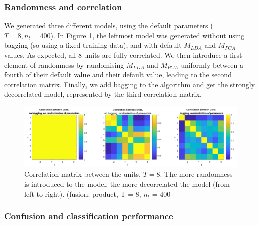 \documentclass[10pt,technote]{IEEEtran}
\begin{document}
\subsubsection{Randomness and correlation}
We generated three different models, using the default parameters ($T = 8, n_t = 400$). In Figure \ref{fig:corrs}, the leftmost model was generated without using bagging (so using a fixed training data), and with default $M_{LDA}$ and $M_{PCA}$ values. As expected, all 8 units are fully correlated. We then introduce a first element of randomness by randomising $M_{LDA}$ and $M_{PCA}$ uniformly between a fourth of their default value and their default value, leading to the second correlation matrix. Finally, we add bagging to the algorithm and get the strongly decorrelated model, represented by the third correlation matrix.  

\begin{figure}[htb!]
    \centering
    \includegraphics[width=\linewidth]{../results/ex2LDAEnsemble/correlation.png}
    \caption{Correlation matrix between the units. $T = 8$. The more randomness is introduced to the model, the more decorrelated the model (from left to right). (fusion: product, T = 8, $n_t$ = 400}
    \label{fig:corrs}
\end{figure}

\subsubsection{Confusion and classification performance}
\end{document}

